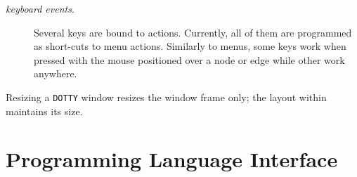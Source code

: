 \begin{description}
\item[{\em keyboard events}.]
Several keys are bound to actions.  Currently, all of them are programmed as
short-cuts to menu actions. Similarly to menus, some keys work when pressed
with the mouse positioned over a node or edge while other work anywhere.

\end{description}

Resizing a \verb+DOTTY+ window resizes the window frame only; the layout within
maintains its size.

\section{Programming Language Interface}

